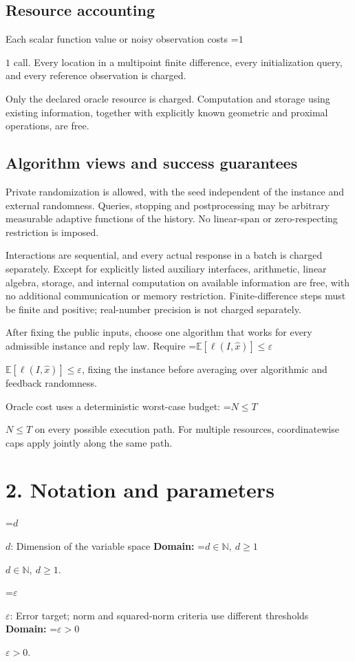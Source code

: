 \documentclass[10pt,a4paper]{article}
\newcommand{\AtlasMath}[1]{\par\begingroup\centering\setbox0=\hbox{$\displaystyle #1$}\ifdim\wd0>1.4\linewidth\typeout{ATLAS WIDE FORMULA: \the\wd0}\fi\ifdim\wd0>\linewidth\resizebox{\linewidth}{!}{\box0}\else\box0\fi\par\endgroup}
\newcommand{\AtlasInlineMath}[1]{\begingroup\setbox0=\hbox{$#1$}\ifdim\wd0>.4\linewidth\endgroup\AtlasMath{#1}\else\endgroup$#1$\fi}
\begin{document}
\subsection{Resource accounting}
Each scalar function value or noisy observation costs \AtlasInlineMath{1} call. Every location in a multipoint finite difference, every initialization query, and every reference observation is charged.

Only the declared oracle resource is charged. Computation and storage using existing information, together with explicitly known geometric and proximal operations, are free.

\subsection{Algorithm views and success guarantees}
Private randomization is allowed, with the seed independent of the instance and external randomness. Queries, stopping and postprocessing may be arbitrary measurable adaptive functions of the history. No linear-span or zero-respecting restriction is imposed.

Interactions are sequential, and every actual response in a batch is charged separately. Except for explicitly listed auxiliary interfaces, arithmetic, linear algebra, storage, and internal computation on available information are free, with no additional communication or memory restriction. Finite-difference steps must be finite and positive; real-number precision is not charged separately.

After fixing the public inputs, choose one algorithm that works for every admissible instance and reply law. Require \AtlasInlineMath{\mathbb{E}[\ell(I,\widehat{x})]\le \varepsilon}, fixing the instance before averaging over algorithmic and feedback randomness.

Oracle cost uses a deterministic worst-case budget: \AtlasInlineMath{N\le T} on every possible execution path. For multiple resources, coordinatewise caps apply jointly along the same path.

\section{2. Notation and parameters}
\AtlasInlineMath{d}: Dimension of the variable space \textbf{Domain:} \AtlasInlineMath{d\in\mathbb{N},\ d\ge1}.

\AtlasInlineMath{\varepsilon}: Error target; norm and squared-norm criteria use different thresholds \textbf{Domain:} \AtlasInlineMath{\varepsilon>0}.
\end{document}
